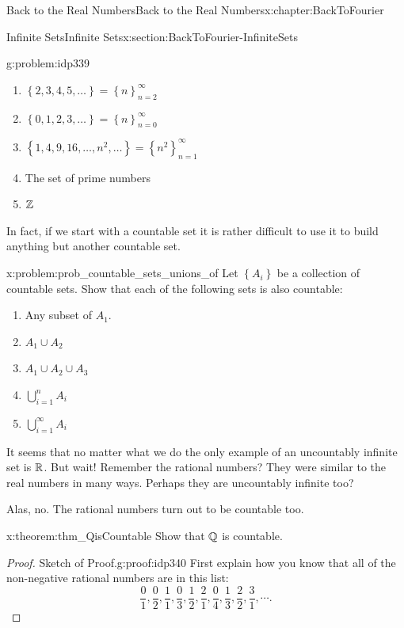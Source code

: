 \begin{chapterptx}{Back to the Real Numbers}{}{Back to the Real Numbers}{}{}{x:chapter:BackToFourier}
\begin{sectionptx}{Infinite Sets}{}{Infinite Sets}{}{}{x:section:BackToFourier-InfiniteSets}
\begin{problem}{}{g:problem:idp339}
\begin{enumerate}[font=\bfseries,label=(\alph*),ref=\alph*]
				\item{}\(\left\{2,3,4,5,\ldots\right\}=\left\{n\right\}_{n=2}^\infty\)%
				\item{}\(\left\{0,1,2,3,\ldots\right\}=\left\{n\right\}_{n=0}^\infty\)%
				\item{}\(\left\{1,4,9,16,\ldots,n^2,\ldots\right\}=\left\{n^2\right\}_{n=1}^\infty\)%
				\item{}The set of prime numbers%
				\item{}\(\mathbb {Z}\)%
			\end{enumerate}
		\end{problem}
		In fact, if we start with a countable set it is rather difficult to use it to build anything but another countable set.%
		\begin{problem}{}{x:problem:prob_countable_sets_unions_of}%
			Let \(\left\{A_i\right\}\) be a collection of countable sets. Show that each of the following sets is also countable:%
			\begin{enumerate}[font=\bfseries,label=(\alph*),ref=\alph*]
				\item{}Any subset of \(A_1\).%
				\item{}\(A_1\cup A_2\)%
				\item{}\(A_1\cup A_2 \cup A_3\)%
				\item{}\(\displaystyle\bigcup_{i=1}^nA_i\)%
				\item{}\(\displaystyle\bigcup_{i=1}^\infty A_i\)%
			\end{enumerate}
		\end{problem}
		It seems that no matter what we do the only example of an uncountably infinite set is \(\mathbb {R}\).  But wait!  Remember the rational numbers?  They were similar to the real numbers in many ways.  Perhaps they are uncountably infinite too?%
		\par
		Alas, no. The rational numbers turn out to be countable too.%
		\begin{theorem}{}{}{x:theorem:thm_QisCountable}%
			 Show that \(\mathbb {Q}\) is countable.%
		\end{theorem}
		\begin{proof}{Sketch of Proof.}{g:proof:idp340}
			First explain how you know that all of the non-negative rational numbers are in this list:%
			\begin{equation*}
				\frac{0}{1},\frac{0}{2},\frac{1}{1},\frac{0}{3}, \frac{1}{2},\frac{2}{1},\frac{0}{4},\frac{1}{3}, \frac{2}{2}, \frac{3}{1}, \cdots\text{.}
			\end{equation*}
			\par

\end{proof}
\end{sectionptx}
\end{chapterptx}
